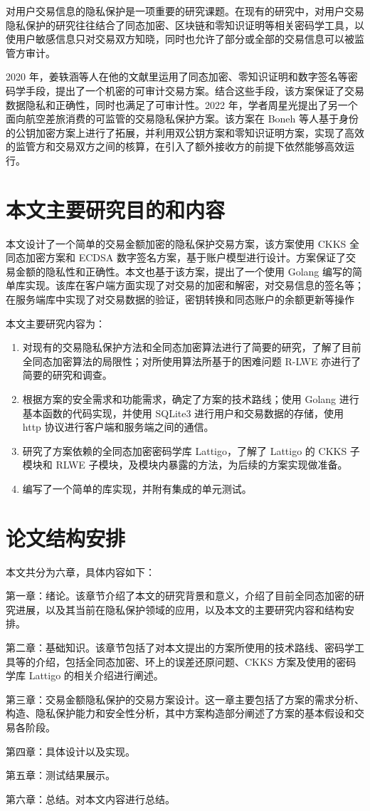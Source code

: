 对用户交易信息的隐私保护是一项重要的研究课题。在现有的研究中，对用户交易隐私保护的研究往往结合了同态加密、区块链和零知识证明等相关密码学工具，以使用户敏感信息只对交易双方知晓，同时也允许了部分或全部的交易信息可以被监管方审计。

2020 年，姜轶涵等人在他的文献里\cite{ACT}运用了同态加密、零知识证明和数字签名等密码学手段，提出了一个机密的可审计交易方案。结合这些手段，该方案保证了交易数据隐私和正确性，同时也满足了可审计性。2022 年，学者周星光提出了另一个面向航空差旅消费的可监管的交易隐私保护方案。\cite{ZXG_Air_privacy}该方案在 Boneh 等人基于身份的公钥加密方案上进行了拓展，并利用双公钥方案和零知识证明方案，实现了高效的监管方和交易双方之间的核算，在引入了额外接收方的前提下依然能够高效运行。

\section{本文主要研究目的和内容}

本文设计了一个简单的交易金额加密的隐私保护交易方案，该方案使用 CKKS 全同态加密方案\cite{cryptoeprint:2016/421}和 ECDSA 数字签名方案，基于账户模型进行设计。方案保证了交易金额的隐私性和正确性。本文也基于该方案，提出了一个使用 Golang 编写的简单库实现。该库在客户端方面实现了对交易的加密和解密，对交易信息的签名等；在服务端库中实现了对交易数据的验证，密钥转换和同态账户的余额更新等操作

本文主要研究内容为：

\begin{enumerate}
    \item 对现有的交易隐私保护方法和全同态加密算法进行了简要的研究，了解了目前全同态加密算法的局限性；对所使用算法所基于的困难问题 R-LWE 亦进行了简要的研究和调查。
    \item 根据方案的安全需求和功能需求，确定了方案的技术路线；使用 Golang 进行基本函数的代码实现，并使用 SQLite3 进行用户和交易数据的存储，使用 http 协议进行客户端和服务端之间的通信。
    \item 研究了方案依赖的全同态加密密码学库 Lattigo\cite{lattigoRepo}，了解了 Lattigo 的 CKKS 子模块和 RLWE 子模块，及模块内暴露的方法，为后续的方案实现做准备。
    \item 编写了一个简单的库实现，并附有集成的单元测试。
\end{enumerate}

\section{论文结构安排}

本文共分为六章，具体内容如下：

第一章：绪论。该章节介绍了本文的研究背景和意义，介绍了目前全同态加密的研究进展，以及其当前在隐私保护领域的应用，以及本文的主要研究内容和结构安排。

第二章：基础知识。该章节包括了对本文提出的方案所使用的技术路线、密码学工具等的介绍，包括全同态加密、环上的误差还原问题、CKKS 方案及使用的密码学库 Lattigo 的相关介绍进行阐述。

第三章：交易金额隐私保护的交易方案设计。这一章主要包括了方案的需求分析、构造、隐私保护能力和安全性分析，其中方案构造部分阐述了方案的基本假设和交易各阶段。

第四章：具体设计以及实现。

第五章：测试结果展示。

第六章：总结。对本文内容进行总结。
